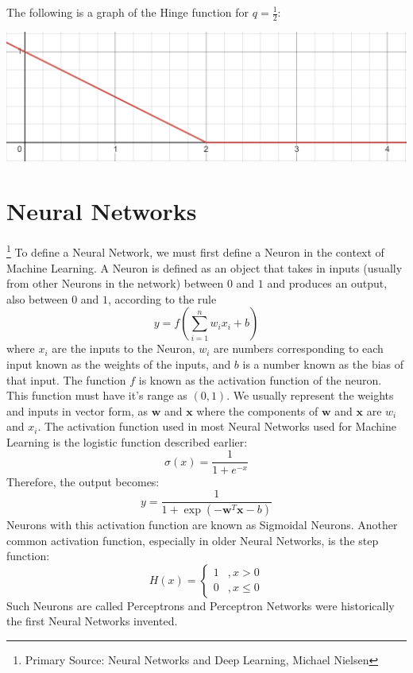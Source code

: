 \documentclass[12 pt]{report}
\begin{document}
    The following is a graph of the Hinge function for $q = \frac{1}{2}$:
    \begin{center}
        \includegraphics[scale = 0.8]{hinge.png}
    \end{center}

    \chapter{Neural Networks} \footnote {Primary Source: Neural Networks and Deep Learning, Michael Nielsen}
    To define a Neural Network, we must first define a Neuron in the context of Machine Learning. A Neuron is defined as an object that takes in inputs
    (usually from other Neurons in the network) between $0$ and $1$ and produces an output, also between $0$ and $1$, according to the rule
    \begin{equation}
        y = f(\sum_{i = 1}^{n} w_{i}x_{i} + b)
    \end{equation}
    where $x_{i}$ are the inputs to the Neuron, $w_{i}$ are numbers corresponding to each input known as the weights of the inputs, and $b$ is a number 
    known as the bias of that input. The function $f$ is known as the activation function of the neuron. This function must have it's range as $(0, 1)$.
    We usually represent the weights and inputs in vector form, as $\bm{w}$ and $\bm{x}$ where the components of $\bm{w}$ and $\bm{x}$ are $w_{i}$ and 
    $x_{i}$.
    The activation function used in most Neural Networks used for Machine Learning is the logistic function described earlier:
    \begin{equation}
        \sigma(x) = \frac{1}{1 + e^{-x}}
    \end{equation}
    Therefore, the output becomes:
    \begin{equation}
        y = \frac{1}{1 + \exp(-\bm{w}^{T}\bm{x} - b)}
    \end{equation}
    Neurons with this activation function are known as Sigmoidal Neurons. Another common activation function, especially in older Neural Networks,
    is the step function:
    \begin{equation}
        H(x) = \begin{cases}
            1 &, x > 0 \\
            0 &, x \leq 0
        \end{cases}
    \end{equation}
    Such Neurons are called Perceptrons and Perceptron Networks were historically the first Neural Networks invented.
\end{document}
